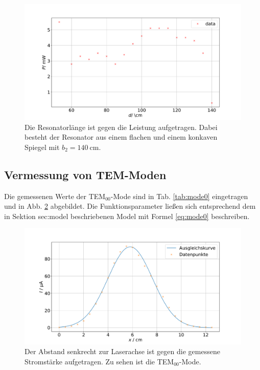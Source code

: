 \begin{figure}
    \centering
    \includegraphics[width=15cm]{plots/stability_flat.pdf}
    \caption{Die Resonatorlänge ist gegen die Leistung aufgetragen. Dabei besteht der Resonator aus einem flachen und einem konkaven Spiegel mit $b_2 = \SI{140}{\centi\meter}$.}
    \label{fig:stability_flat}
\end{figure} 

\subsection{Vermessung von TEM-Moden}

Die gemessenen Werte der TEM$_{00}$-Mode sind in Tab. \ref{tab:mode0} eingetragen und in Abb. \ref{fig:mode0} abgebildet. 
Die Funktionsparameter ließen sich entsprechend dem in Sektion {sec:model} beschriebenen Model mit Formel \eqref{eq:mode0} beschreiben.


\begin{figure}
    \centering
    \includegraphics[width=\textwidth]{plots/mode0.pdf}
    \caption{Der Abstand senkrecht zur Laserachse ist gegen die gemessene Stromstärke aufgetragen. Zu sehen ist die TEM$_{00}$-Mode.}
    \label{fig:mode0}
\end{figure}


